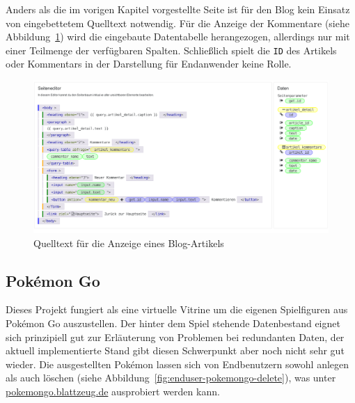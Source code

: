 Anders als die im vorigen Kapitel  vorgestellte Seite ist für den Blog kein Einsatz von eingebettetem Quelltext notwendig. Für die Anzeige der Kommentare (siehe Abbildung~\ref{fig:project-blog-page-article}) wird die eingebaute Datentabelle herangezogen, allerdings nur mit einer Teilmenge der verfügbaren Spalten. Schließlich spielt die \texttt{ID} des Artikels oder Kommentars in der Darstellung für Endanwender keine Rolle.

\begin{figure}[h]
  \centering \includegraphics[width=\textwidth]{images/screenshots/20161019/editor-project-blog-page-article.png}
  \caption{Quelltext für die Anzeige eines Blog-Artikels}
  \label{fig:project-blog-page-article}
\end{figure}

\subsection{Pokémon Go}

Dieses Projekt fungiert als eine virtuelle Vitrine um die eigenen Spielfiguren aus Pokémon Go auszustellen. Der hinter dem Spiel stehende Datenbestand eignet sich prinzipiell gut zur Erläuterung von Problemen bei redundanten Daten, der aktuell implementierte Stand gibt diesen Schwerpunkt aber noch nicht sehr gut wieder. Die ausgestellten Pokémon lassen sich von Endbenutzern sowohl anlegen als auch löschen (siehe Abbildung~\ref{fig:enduser-pokemongo-delete}), was unter \href{http://pokemongo.blattzeug.de/}{\mbox{pokemongo.blattzeug.de}} ausprobiert werden kann.

